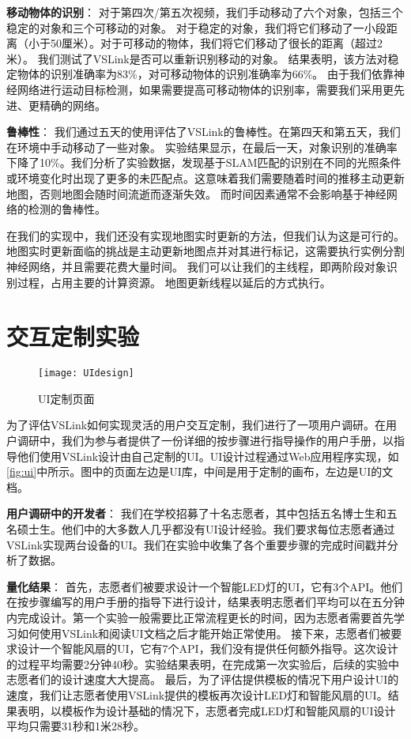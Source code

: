 \textbf{移动物体的识别}：
对于第四次/第五次视频，我们手动移动了六个对象，包括三个稳定的对象和三个可移动的对象。
对于稳定的对象，我们将它们移动了一小段距离（小于50厘米）。对于可移动的物体，我们将它们移动了很长的距离（超过2米）。
我们测试了VSLink是否可以重新识别移动的对象。
结果表明，该方法对稳定物体的识别准确率为83\%，对可移动物体的识别准确率为66\%。
由于我们依靠神经网络进行运动目标检测，如果需要提高可移动物体的识别率，需要我们采用更先进、更精确的网络。


\textbf{鲁棒性}：
我们通过五天的使用评估了VSLink的鲁棒性。在第四天和第五天，我们在环境中手动移动了一些对象。
实验结果显示，在最后一天，对象识别的准确率下降了10\%。我们分析了实验数据，发现基于SLAM匹配的识别在不同的光照条件或环境变化时出现了更多的未匹配点。这意味着我们需要随着时间的推移主动更新地图，否则地图会随时间流逝而逐渐失效。
而时间因素通常不会影响基于神经网络的检测的鲁棒性。

在我们的实现中，我们还没有实现地图实时更新的方法，但我们认为这是可行的。地图实时更新面临的挑战是主动更新地图点并对其进行标记，这需要执行实例分割神经网络，并且需要花费大量时间。
我们可以让我们的主线程，即两阶段对象识别过程，占用主要的计算资源。
地图更新线程以延后的方式执行。


\section{交互定制实验}

\begin{figure*}[htbp]
	\centering
	\texttt{[image: UIdesign]}
	\caption{UI定制页面}
	\label{fig:ui}
\end{figure*}

为了评估VSLink如何实现灵活的用户交互定制，我们进行了一项用户调研。在用户调研中，我们为参与者提供了一份详细的按步骤进行指导操作的用户手册，以指导他们使用VSLink设计由自己定制的UI。UI设计过程通过Web应用程序实现，如\autoref{fig:ui}中所示。图中的页面左边是UI库，中间是用于定制的画布，左边是UI的文档。

\textbf{用户调研中的开发者}： 
我们在学校招募了十名志愿者，其中包括五名博士生和五名硕士生。他们中的大多数人几乎都没有UI设计经验。我们要求每位志愿者通过VSLink实现两台设备的UI。我们在实验中收集了各个重要步骤的完成时间戳并分析了数据。


\textbf{量化结果}： 
首先，志愿者们被要求设计一个智能LED灯的UI，它有3个API。他们在按步骤编写的用户手册的指导下进行设计，结果表明志愿者们平均可以在五分钟内完成设计。第一个实验一般需要比正常流程更长的时间，因为志愿者需要首先学习如何使用VSLink和阅读UI文档之后才能开始正常使用。
接下来，志愿者们被要求设计一个智能风扇的UI，它有7个API，我们没有提供任何额外指导。这次设计的过程平均需要2分钟40秒。实验结果表明，在完成第一次实验后，后续的实验中志愿者们的设计速度大大提高。
最后，为了评估提供模板的情况下用户设计UI的速度，我们让志愿者使用VSLink提供的模板再次设计LED灯和智能风扇的UI。结果表明，以模板作为设计基础的情况下，志愿者完成LED灯和智能风扇的UI设计平均只需要31秒和1米28秒。

